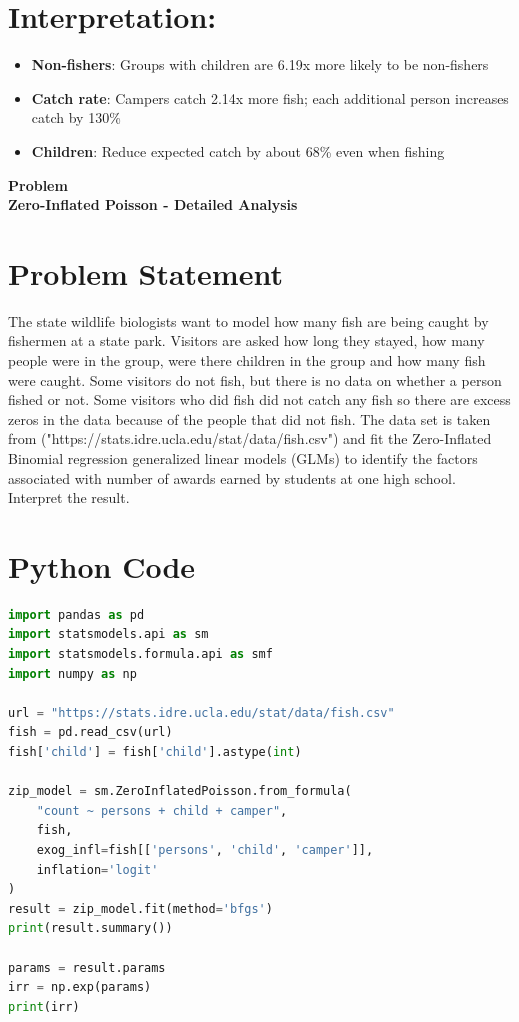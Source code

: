 \documentclass[12pt, a4paper]{article}
\newcounter{problemcounter}
\newcommand{\problemtitle}[1]{%
    \vspace{0.5cm}
    \begin{center}
        \colorbox{DeepGold!20}{\parbox{0.85\textwidth}{\centering
            {\color{RoyalNavy}\Huge\bfseries Problem \arabic{problemcounter}}\\[0.2cm]
            {\color{Charcoal}\large\bfseries #1}
        }}
    \end{center}
    \stepcounter{problemcounter}
    \vspace{0.3cm}
}
\begin{document}
\section*{Interpretation:}
\begin{itemize}
    \item \textbf{Non-fishers}: Groups with children are 6.19x more likely to be non-fishers
    \item \textbf{Catch rate}: Campers catch 2.14x more fish; each additional person increases catch by 130\%
    \item \textbf{Children}: Reduce expected catch by about 68\% even when fishing
\end{itemize}

\newpage

\problemtitle{Zero-Inflated Poisson - Detailed Analysis}

\section{Problem Statement}The state wildlife biologists want to model how many fish are being caught by fishermen at a state park. Visitors are asked how long they stayed, how many people were in the group, were there children in the group and how many fish were caught. Some visitors do not fish, but there is no data on whether a person fished or not. Some visitors who did fish did not catch any fish so there are excess zeros in the data because of the people that did not fish. The data set is taken from ("https://stats.idre.ucla.edu/stat/data/fish.csv") and fit the Zero-Inflated Binomial regression generalized linear models (GLMs) to identify the factors associated with number of awards earned by students at one high school. Interpret the result.

\section*{Python Code}

\begin{lstlisting}[language=Python]
import pandas as pd
import statsmodels.api as sm
import statsmodels.formula.api as smf
import numpy as np

url = "https://stats.idre.ucla.edu/stat/data/fish.csv"
fish = pd.read_csv(url)
fish['child'] = fish['child'].astype(int)

zip_model = sm.ZeroInflatedPoisson.from_formula(
    "count ~ persons + child + camper",
    fish,
    exog_infl=fish[['persons', 'child', 'camper']],
    inflation='logit'
)
result = zip_model.fit(method='bfgs')
print(result.summary())

params = result.params
irr = np.exp(params)
print(irr)
\end{lstlisting}
\end{document}
